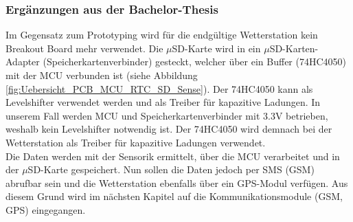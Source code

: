 \subsubsection{Ergänzungen aus der Bachelor-Thesis}
Im Gegensatz zum Prototyping wird für die endgültige Wetterstation kein Breakout Board mehr verwendet. Die $\mu$SD-Karte wird in ein $\mu$SD-Karten-Adapter (Speicherkartenverbinder) gesteckt, welcher über ein Buffer (74HC4050) mit der MCU verbunden ist (siehe Abbildung \ref{fig:Uebersicht_PCB_MCU_RTC_SD_Sense}). Der 74HC4050 kann als Levelshifter verwendet werden und als Treiber für kapazitive Ladungen. In unserem Fall werden MCU und Speicherkartenverbinder mit 3.3V betrieben, weshalb kein Levelshifter notwendig ist. Der 74HC4050 wird demnach bei der Wetterstation als Treiber für kapazitive Ladungen verwendet.\\

Die Daten werden mit der Sensorik ermittelt, über die MCU verarbeitet und in der $\mu$SD-Karte gespeichert. Nun sollen die Daten jedoch per SMS (GSM) abrufbar sein und die Wetterstation ebenfalls über ein GPS-Modul verfügen. Aus diesem Grund wird im nächsten Kapitel auf die Kommunikationsmodule (GSM, GPS) eingegangen.
 